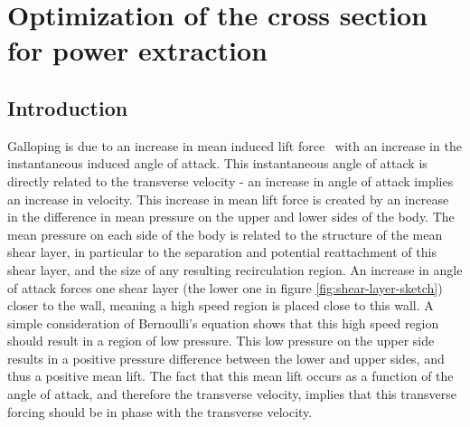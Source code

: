 \chapter{Optimization of the cross section for power extraction}
\label{chap:cross-sections}
\section{Introduction}



 Galloping is due to an increase in mean induced lift force \cy\  with an increase in the instantaneous induced angle of attack. This instantaneous angle of attack is directly related to the transverse velocity - an increase in angle of attack implies an increase in velocity. This increase in mean lift force is created by an increase in the difference in mean pressure on the upper and lower sides of the body. The mean pressure on each side of the body is related to the structure of the mean shear layer, in particular to the separation and potential reattachment of this shear layer, and the size of any resulting recirculation region. An increase in angle of attack forces one shear layer (the lower one in figure \ref{fig:shear-layer-sketch}) closer to the wall, meaning a high speed region is placed close to this wall. A simple consideration of Bernoulli's equation shows that this high speed region should result in a region of low pressure. This low pressure on the upper side results in a positive pressure difference between the lower and upper sides, and thus a positive mean lift. The fact that this mean lift occurs as a function of the angle of attack, and therefore the transverse velocity, implies that this transverse forcing should be in phase with the transverse velocity.

